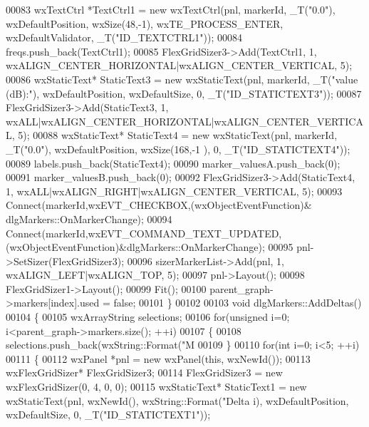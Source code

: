 \begin{DoxyCode}
{{00083     wxTextCtrl *TextCtrl1 = \textcolor{keyword}{new} wxTextCtrl(pnl, markerId, \_T(\textcolor{stringliteral}{"0.0"}), wxDefaultPosition, wxSize(48,-1), 
      wxTE\_PROCESS\_ENTER, wxDefaultValidator, \_T(\textcolor{stringliteral}{"ID\_TEXTCTRL1"}));
00084     freqs.push\_back(TextCtrl1);
00085     FlexGridSizer3->Add(TextCtrl1, 1, wxALIGN\_CENTER\_HORIZONTAL|wxALIGN\_CENTER\_VERTICAL, 5);
00086     wxStaticText* StaticText3 = \textcolor{keyword}{new} wxStaticText(pnl, markerId, \_T(\textcolor{stringliteral}{"value (dB):"}), wxDefaultPosition, 
      wxDefaultSize, 0, \_T(\textcolor{stringliteral}{"ID\_STATICTEXT3"}));
00087     FlexGridSizer3->Add(StaticText3, 1, wxALL|wxALIGN\_CENTER\_HORIZONTAL|wxALIGN\_CENTER\_VERTICAL, 5);
00088     wxStaticText* StaticText4 = \textcolor{keyword}{new} wxStaticText(pnl, markerId, \_T(\textcolor{stringliteral}{"0.0"}), wxDefaultPosition, wxSize(168,-1
      ), 0, \_T(\textcolor{stringliteral}{"ID\_STATICTEXT4"}));
00089     labels.push\_back(StaticText4);
00090     marker_valuesA.push\_back(0);
00091     marker_valuesB.push\_back(0);
00092     FlexGridSizer3->Add(StaticText4, 1, wxALL|wxALIGN\_RIGHT|wxALIGN\_CENTER\_VERTICAL, 5);
00093     Connect(markerId,wxEVT\_CHECKBOX,(wxObjectEventFunction)&
      dlgMarkers::OnMarkerChange);
00094     Connect(markerId,wxEVT\_COMMAND\_TEXT\_UPDATED,(wxObjectEventFunction)&dlgMarkers::OnMarkerChange);
00095     pnl->SetSizer(FlexGridSizer3);
00096     sizerMarkerList->Add(pnl, 1, wxALIGN\_LEFT|wxALIGN\_TOP, 5);
00097     pnl->Layout();
00098     FlexGridSizer1->Layout();
00099     Fit();
00100     parent_graph->markers[index].used = \textcolor{keyword}{false};
00101 \}
00102 
00103 \textcolor{keywordtype}{void} dlgMarkers::AddDeltas()
00104 \{
00105     wxArrayString selections;
00106     \textcolor{keywordflow}{for}(\textcolor{keywordtype}{unsigned} i=0; i<parent_graph->markers.size(); ++i)
00107     \{
00108         selections.push\_back(wxString::Format(\textcolor{stringliteral}{"M%
00109     \}
00110     \textcolor{keywordflow}{for}(\textcolor{keywordtype}{int} i=0; i<5; ++i)
00111     \{
00112         wxPanel *pnl = \textcolor{keyword}{new} wxPanel(\textcolor{keyword}{this}, wxNewId());
00113         wxFlexGridSizer* FlexGridSizer3;
00114         FlexGridSizer3 = \textcolor{keyword}{new} wxFlexGridSizer(0, 4, 0, 0);
00115         wxStaticText* StaticText1 = \textcolor{keyword}{new} wxStaticText(pnl, wxNewId(), wxString::Format(\textcolor{stringliteral}{"Delta%
      i), wxDefaultPosition, wxDefaultSize, 0, \_T(\textcolor{stringliteral}{"ID\_STATICTEXT1"}));
}}}}
\end{DoxyCode}
